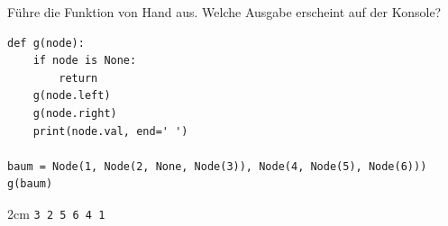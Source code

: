 \question[3]
Führe die Funktion von Hand aus. Welche Ausgabe erscheint auf der Konsole?
\begin{lstlisting}
def g(node):
    if node is None:
        return
    g(node.left)
    g(node.right)
    print(node.val, end=' ')

baum = Node(1, Node(2, None, Node(3)), Node(4, Node(5), Node(6)))
g(baum)
\end{lstlisting}
\begin{solutionbox}{2cm}
\texttt{3 2 5 6 4 1}
\end{solutionbox}
